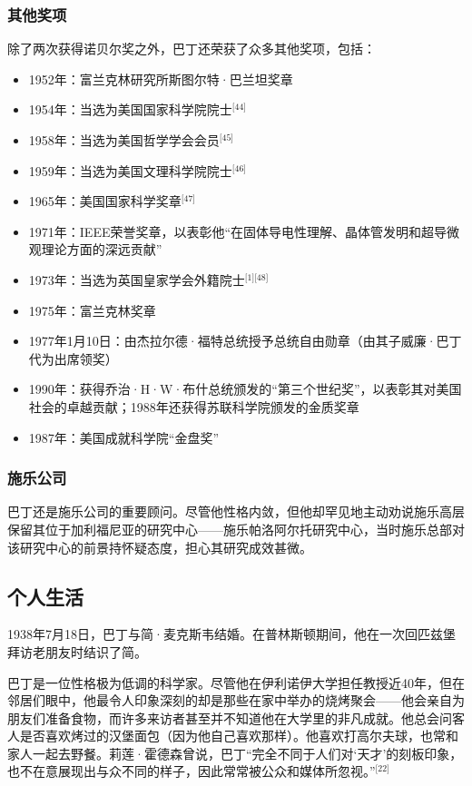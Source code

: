 \subsubsection{其他奖项}
除了两次获得诺贝尔奖之外，巴丁还荣获了众多其他奖项，包括：
\begin{itemize}
\item 1952年：富兰克林研究所斯图尔特·巴兰坦奖章
\item 1954年：当选为美国国家科学院院士\(^\text{[44]}\)
\item 1958年：当选为美国哲学学会会员\(^\text{[45]}\)
\item 1959年：当选为美国文理科学院院士\(^\text{[46]}\)
\item 1965年：美国国家科学奖章\(^\text{[47]}\)
\item 1971年：IEEE荣誉奖章，以表彰他“在固体导电性理解、晶体管发明和超导微观理论方面的深远贡献”
\item 1973年：当选为英国皇家学会外籍院士\(^\text{[1][48]}\)
\item 1975年：富兰克林奖章
\item 1977年1月10日：由杰拉尔德·福特总统授予总统自由勋章（由其子威廉·巴丁代为出席领奖）
\item 1990年：获得乔治·H·W·布什总统颁发的“第三个世纪奖”，以表彰其对美国社会的卓越贡献；1988年还获得苏联科学院颁发的金质奖章
\item 1987年：美国成就科学院“金盘奖”
\end{itemize}
\subsubsection{施乐公司}
巴丁还是施乐公司的重要顾问。尽管他性格内敛，但他却罕见地主动劝说施乐高层保留其位于加利福尼亚的研究中心——施乐帕洛阿尔托研究中心，当时施乐总部对该研究中心的前景持怀疑态度，担心其研究成效甚微。
\subsection{个人生活}
1938年7月18日，巴丁与简·麦克斯韦结婚。在普林斯顿期间，他在一次回匹兹堡拜访老朋友时结识了简。

巴丁是一位性格极为低调的科学家。尽管他在伊利诺伊大学担任教授近40年，但在邻居们眼中，他最令人印象深刻的却是那些在家中举办的烧烤聚会——他会亲自为朋友们准备食物，而许多来访者甚至并不知道他在大学里的非凡成就。他总会问客人是否喜欢烤过的汉堡面包（因为他自己喜欢那样）。他喜欢打高尔夫球，也常和家人一起去野餐。莉莲·霍德森曾说，巴丁“完全不同于人们对‘天才’的刻板印象，也不在意展现出与众不同的样子，因此常常被公众和媒体所忽视。”\(^\text{[22]}\)

